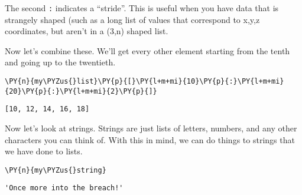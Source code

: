     The second \texttt{:} indicates a ``stride''. This is useful when you
have data that is strangely shaped (such as a long list of values that
correspond to x,y,z coordinates, but aren't in a (3,n) shaped list.

Now let's combine these. We'll get every other element starting from the
tenth and going up to the twentieth.

    \begin{tcolorbox}[breakable, size=fbox, boxrule=1pt, pad at break*=1mm,colback=cellbackground, colframe=cellborder]
\begin{Verbatim}[commandchars=\\\{\}]
\PY{n}{my\PYZus{}list}\PY{p}{[}\PY{l+m+mi}{10}\PY{p}{:}\PY{l+m+mi}{20}\PY{p}{:}\PY{l+m+mi}{2}\PY{p}{]}
\end{Verbatim}
\end{tcolorbox}

            \begin{tcolorbox}[breakable, size=fbox, boxrule=.5pt, pad at break*=1mm, opacityfill=0]
\begin{Verbatim}[commandchars=\\\{\}]
[10, 12, 14, 16, 18]
\end{Verbatim}
\end{tcolorbox}
        
    Now let's look at strings. Strings are just lists of letters, numbers,
and any other characters you can think of. With this in mind, we can do
things to strings that we have done to lists.

    \begin{tcolorbox}[breakable, size=fbox, boxrule=1pt, pad at break*=1mm,colback=cellbackground, colframe=cellborder]
\begin{Verbatim}[commandchars=\\\{\}]
\PY{n}{my\PYZus{}string}
\end{Verbatim}
\end{tcolorbox}

            \begin{tcolorbox}[breakable, size=fbox, boxrule=.5pt, pad at break*=1mm, opacityfill=0]
\begin{Verbatim}[commandchars=\\\{\}]
'Once more into the breach!'
\end{Verbatim}
\end{tcolorbox}
        
